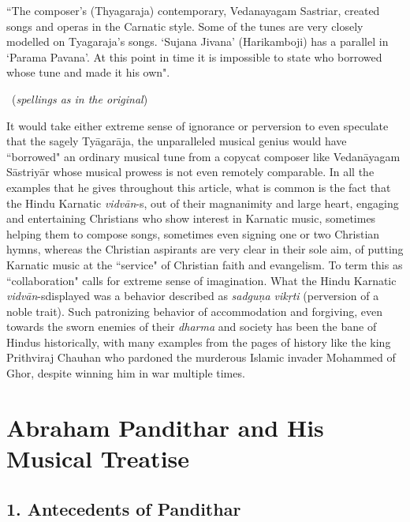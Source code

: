\begin{myquote}
``The composer's (Thyagaraja) contemporary, Vedanayagam Sastriar, created songs and operas in the Carnatic style. Some of the tunes are very closely modelled on Tyagaraja's songs. `Sujana Jivana' (Harikamboji) has a parallel in `Parama Pavana'. At this point in time it is impossible to state who borrowed whose tune and made it his own". 

~\hfill (\textit{spellings as in the original})
\end{myquote}

It would take either extreme sense of ignorance or perversion to even speculate that the sagely Tyāgarāja, the unparalleled musical genius would have ``borrowed" an ordinary musical tune from a copycat composer like Vedanāyagam Sāstriyār whose musical prowess is not even remotely comparable. In all the examples that he gives throughout this article, what is common is the fact that the Hindu Karnatic \textit{vidvān}-s, out of their magnanimity and large heart, engaging and entertaining Christians who show interest in Karnatic music, sometimes helping them to compose songs, sometimes even signing one or two Christian hymns, whereas the Christian aspirants are very clear in their sole aim, of putting Karnatic music at the ``service" of Christian faith and evangelism. To term this as ``collaboration" calls for extreme sense of imagination. What the Hindu Karnatic \textit{vidvān}-s\break displayed was a behavior described as \textit{sadguṇa vikṛti} (perversion of a noble trait). Such patronizing behavior of accommodation and forgiving, even towards the sworn enemies of their \textit{dharma} and society has been the bane of Hindus historically, with many examples from the pages of history like the king Prithviraj Chauhan who pardoned the murderous Islamic invader Mohammed of Ghor, despite winning him in war multiple times.

\vspace{-.2cm}

\section*{Abraham Pandithar and His Musical Treatise}

\subsection*{1. Antecedents of Pandithar}

